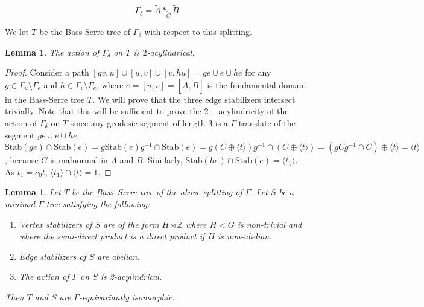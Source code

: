 \documentclass{amsart}
\newcommand{\Z}{\mathbb{Z}}
\theoremstyle{plain}
\newtheorem{lemma}[thm]{Lemma}
\theoremstyle{definition}
\theoremstyle{remark}
\begin{document}
$$\Gamma_{\delta} = \tilde{A} *_{\tilde{C}} \tilde{B}$$

We let $T$ be the Bass-Serre tree of $\Gamma_\delta$ with respect to this splitting. 

\begin{lemma}
    \label{lemma: acylindricity of separating mapping torus}
    The action of $\Gamma_\delta$ on $T$ is $2$-acylindrical.
\end{lemma}

\begin{proof}
    Consider a path $[gv, u]\cup[u, v]\cup[v, hu] = ge \cup e \cup he$ for any $g \in \Gamma_u\setminus\Gamma_e$ and $h \in \Gamma_v\setminus\Gamma_e$, where $e = [u, v] = [\tilde{A},\tilde{B}]$ is the fundamental domain in the Bass-Serre tree $T$. We will prove that the three edge stabilizers intersect trivially. Note that this will be sufficient to prove the $2-$acylindricity of the action of $\Gamma_\delta$ on $T$ since any geodesic segment of length 3 is a $\Gamma$-translate of the segment $ge \cup e \cup he$. $\mathrm{Stab}(ge) \cap \mathrm{Stab}(e) = g\mathrm{Stab}(e)g^{-1} \cap \mathrm{Stab}(e) = g(C \oplus \langle t \rangle)g^{-1} \cap (C \oplus \langle t \rangle) = (gCg^{-1} \cap C) \oplus \langle t \rangle = \langle t \rangle$, because $C$ is malnormal in $A$ and $B$. Similarly, $\mathrm{Stab}(he) \cap \mathrm{Stab}(e) = \langle t_1 \rangle$. As $t_1 = c_0t$, $\langle t_1 \rangle \cap \langle t \rangle = 1$.
\end{proof}


\begin{lemma}
    \label{lem: Canonicity lemma for separating Dehn twists}
    Let $T$ be the Bass--Serre tree of the above splitting of $\Gamma$. Let $S$ be a minimal $\Gamma$-tree satisfying the following: 

    \begin{enumerate}
        \item Vertex stabilizers of $S$ are of the form $H \rtimes \Z$ where $H < G$ is non-trivial and where the semi-direct product is a direct product if $H$ is non-abelian. 
        \item Edge stabilizers of $S$ are abelian.
        \item The action of $\Gamma$ on $S$ is 2-acylindrical.
    \end{enumerate}
    Then $T$ and $S$ are $\Gamma$-equivariantly isomorphic.
\end{lemma}
\end{document}
